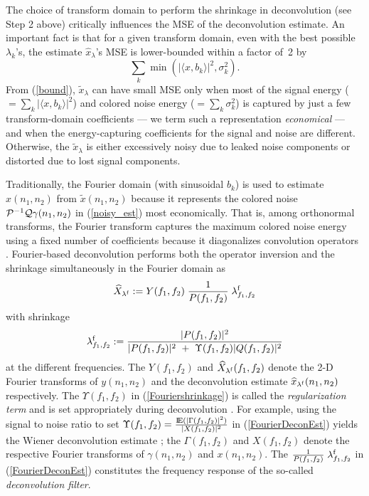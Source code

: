 \documentclass[11pt]{article}
\def\nnnx {n_1}
\def\nnny {n_2}
\def\fffx {f_1}
\def\fffy {f_2}
\newcommand{\expect}{{\rm I \mkern-2.5mu \nonscript\mkern-.5mu E}}
\def\cP { {\cal{P}} }
\def\cQ { {\cal{Q}} }
\begin{document}
The choice of transform domain to perform the shrinkage in
deconvolution (see Step 2 above) critically influences the MSE of the
deconvolution estimate. An important fact is that for a given
transform domain, even with the best possible $\lambda_k$'s, the
estimate $\widehat{x}_\lambda$'s MSE is lower-bounded within a
factor \mbox{of~2} by \cite{nonlin-soln-don,mallat-new,Donoho5}
\begin{equation}
\sum_k \min\left(|\langle x,b_k\rangle|^2, \sigma_k^2\right).
\label{bound}
\end{equation}
From (\ref{bound}), $\widetilde{x}_\lambda$
can have small MSE only when most of the signal energy ($ =
\sum_k|\langle x,b_k\rangle|^2$) and colored noise energy ($= \sum_k
\sigma_k^2$) is captured by just a few transform-domain coefficients --- we term such a representation {\em economical} --- and when the
energy-capturing coefficients for the signal and noise are
different. Otherwise, the $\widetilde{x}_\lambda$ is either
excessively noisy due to leaked noise components or distorted due to
lost signal components.


Traditionally, the Fourier domain (with sinusoidal $b_k$) is used to
estimate $x(\nnnx,\nnny)$ from $\widetilde{x}(\nnnx,\nnny)$ because it
represents the colored noise $\cP^{-1}\cQ \gamma(\nnnx,\nnny)$ in
(\ref{noisy_est}) most economically. That is, among orthonormal
transforms, the Fourier transform captures the maximum colored noise
energy using a fixed number of coefficients because it diagonalizes
convolution operators \cite{Davis1}. Fourier-based deconvolution
performs both the operator inversion and the shrinkage simultaneously
in the Fourier domain as
\begin{equation}\widehat{X}_{\lambda^{\rm f}}
:= Y(\fffx,\fffy) \;\frac{1}{P(\fffx,\fffy)}\;\lambda^{\rm f}_{\fffx,\fffy}
\label{FourierDeconEst}
\end{equation}
with shrinkage
\begin{equation}
\lambda^{\rm f}_{\fffx,\fffy}
:= 
\frac{|P(\fffx,\fffy)|^{2}}{|P(\fffx,\fffy)|^{2}~+~\Upsilon(\fffx,\fffy)|Q(\fffx,\fffy)|^{2}}
\label{Fouriershrinkage}
\end{equation}
at the different frequencies. The $Y(\fffx,\fffy)$ and
$\widehat{X}_{\lambda^{\rm f}}(\fffx,\fffy)$ denote the 2-D Fourier
transforms of $y(\nnnx,\nnny)$ and the deconvolution estimate
$\widehat{x}_{\lambda^{\rm f}}(\nnnx,\nnny)$ respectively. The
$\Upsilon(\fffx,\fffy)$ in (\ref{Fouriershrinkage}) is called the {\em
regularization term} and is set appropriately during deconvolution
\cite{katman-book}. For example, using the signal to noise ratio to
set
$\Upsilon(\fffx,\fffy)=\frac{\expect(|\Gamma(\fffx,\fffy)|^2)}{|X(\fffx,\fffy)|^2}$
in (\ref{FourierDeconEst}) yields the Wiener deconvolution estimate
\cite{castleman}; the $\Gamma(\fffx,\fffy)$ and $X(\fffx,\fffy)$
denote the respective Fourier transforms of $\gamma(\nnnx,\nnny)$ and
$x(\nnnx,\nnny)$.  The $\frac{1}{P(\fffx,\fffy)}\;\lambda^{\rm
f}_{\fffx,\fffy}$ in (\ref{FourierDeconEst}) constitutes the frequency
response of the so-called {\em deconvolution filter}.
\end{document}
